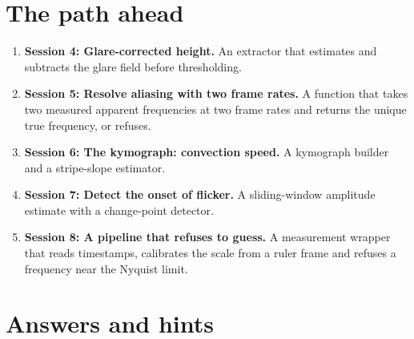 \documentclass[11pt,a4paper]{article}
\begin{document}
\section{The path ahead}
\begin{enumerate}[nosep]
\item \textbf{Session 4: Glare-corrected height.} An extractor that estimates and subtracts the glare field before thresholding.
\item \textbf{Session 5: Resolve aliasing with two frame rates.} A function that takes two measured apparent frequencies at two frame rates and returns the unique true frequency, or refuses.
\item \textbf{Session 6: The kymograph: convection speed.} A kymograph builder and a stripe-slope estimator.
\item \textbf{Session 7: Detect the onset of flicker.} A sliding-window amplitude estimate with a change-point detector.
\item \textbf{Session 8: A pipeline that refuses to guess.} A measurement wrapper that reads timestamps, calibrates the scale from a ruler frame and refuses a frequency near the Nyquist limit.
\end{enumerate}

\section{Answers and hints}
\end{document}
